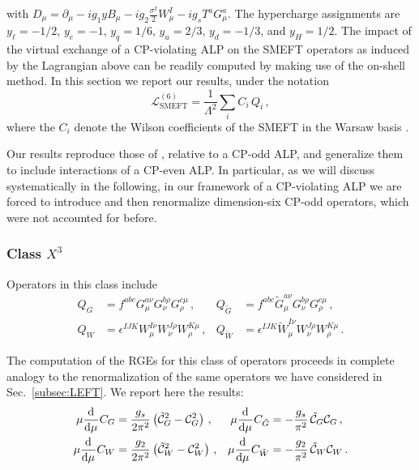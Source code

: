 with $D_\mu = \partial_\mu - i g_1 y B_\mu - i g_2 \frac{\sigma^I}{2}W_\mu^I-i g_s T^a G^a_\mu$.
The hypercharge assignments are $y_\ell = -1/2$, $y_e = -1$, $y_q=1/6$, $y_u=2/3$, $y_d = -1/3$, and $y_H = 1/2$.
%
The impact of the virtual exchange of a CP-violating ALP on the SMEFT operators as induced by the Lagrangian above can be readily computed by making use of the on-shell method. In this section we report our results, under the notation 
\begin{equation}
\mathcal L_{\text{SMEFT}}^{(6)} = \frac{1}{\Lambda^2} \sum_i C_i \,Q_i \,,
\end{equation}
where the $C_i$ denote the Wilson coefficients of the SMEFT in the Warsaw basis \cite{Grzadkowski:2010es}.

Our results reproduce those of \cite{Galda:2021hbr}, relative to a CP-odd ALP, and generalize them to include interactions of a CP-even ALP.
In particular, as we will discuss systematically in the following, in our framework of a CP-violating ALP we are forced to introduce and then renormalize dimension-six CP-odd operators, which were not accounted for before.

\subsubsection{Class $X^3$}

Operators in this class include 
\begin{align}
Q_G &= f^{abc} G_\mu^{a\nu}G_\nu^{b \rho}G_\rho^{c\mu}\,,  & Q_{\tilde{G}} &= f^{abc} \tilde G_\mu^{a\nu}G_\nu^{b \rho}G_\rho^{c\mu}\,,  \\
Q_W &= \epsilon^{IJK} W_\mu^{I\nu}W_\nu^{J \rho}W_\rho^{K\mu}\,,  & Q_{\tilde{W}} &= \epsilon^{IJK} \tilde{W}_\mu^{I\nu}W_\nu^{J \rho}W_\rho^{K\mu}\,. 
\end{align}

The computation of the RGEs for this class of operators proceeds in complete analogy to the renormalization of the same operators we have considered in Sec.~\ref{subsec:LEFT}. We report here the results:
\begin{align}
\mu\dv[]{}{\mu}{C}_G &= \frac{g_s}{2\pi^2}   \left(\tilde{\mathcal{C}}_{G}^2 - \mathcal{C}^2_{G} \right)\,, & \mu\dv[]{}{\mu}{C}_{\tilde{G}} &= -\frac{g_s}{\pi^2}  \,\tilde{\mathcal{C}}_{G}\mathcal{C}_{G}\,,  \\
\mu\dv[]{}{\mu}{C}_W &=\frac{g_2}{2\pi^2}   \left(\tilde{\mathcal{C}}_{W}^2 - \mathcal{C}^2_{W} \right)\,, & \mu\dv[]{}{\mu}{C}_{\tilde{W}} &= -\frac{g_2}{\pi^2} \, \tilde{\mathcal{C}}_{W}\mathcal{C}_{W}  \,.
\end{align}
%

